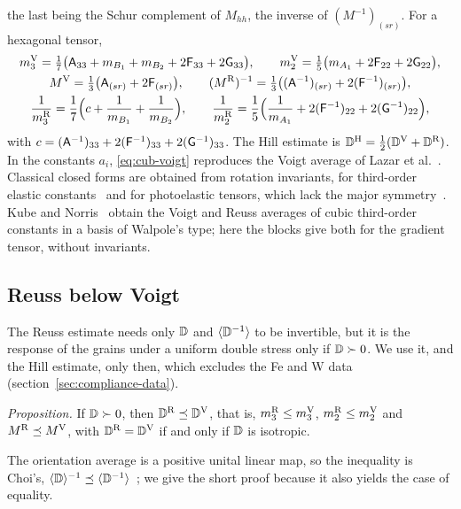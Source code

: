 the last being the Schur complement of $M_{hh}$, the inverse of $(M^{-1})_{(sr)}$. For a
hexagonal tensor,
\begin{equation}
\begin{gathered}
m_3^{\mathrm{V}}=\tfrac17\big(\mathsf{A}_{33}+m_{B_1}+m_{B_2}+2\mathsf{F}_{33}+2\mathsf{G}_{33}\big),\qquad
m_2^{\mathrm{V}}=\tfrac15\big(m_{A_1}+2\mathsf{F}_{22}+2\mathsf{G}_{22}\big),\\
M^{\mathrm{V}}=\tfrac13\big(\mathsf{A}_{(sr)}+2\mathsf{F}_{(sr)}\big),\qquad
(M^{\mathrm{R}})^{-1}=\tfrac13\big((\mathsf{A}^{-1})_{(sr)}+2(\mathsf{F}^{-1})_{(sr)}\big),\\
\frac1{m_3^{\mathrm{R}}}=\frac17\Big(c+\frac1{m_{B_1}}+\frac1{m_{B_2}}\Big),\qquad
\frac1{m_2^{\mathrm{R}}}=\frac15\Big(\frac1{m_{A_1}}+2(\mathsf{F}^{-1})_{22}+2(\mathsf{G}^{-1})_{22}\Big),
\end{gathered}\label{eq:hex-voigt-reuss}
\end{equation}
with $c=(\mathsf{A}^{-1})_{33}+2(\mathsf{F}^{-1})_{33}+2(\mathsf{G}^{-1})_{33}$. The Hill estimate is
$\mathbb{D}^{\mathrm{H}}=\tfrac12(\mathbb{D}^{\mathrm{V}}+\mathbb{D}^{\mathrm{R}})$. In the constants $a_i$, \eqref{eq:cub-voigt}
reproduces the Voigt average of Lazar et al.~\cite[eq.~(158)]{Lazar2022}. Classical closed
forms are obtained from rotation invariants, for third-order elastic
constants~\cite[eqs.~(2.4) and~(2.6)]{Blaschke2017} and for photoelastic tensors, which
lack the major symmetry~\cite{Ranganath1973}. Kube and Norris~\cite{Kube2026} obtain the
Voigt and Reuss averages of cubic third-order constants in a basis of Walpole's type; here
the blocks give both for the gradient tensor, without invariants.

\subsection{Reuss below Voigt}\label{sec:averages-order}

The Reuss estimate needs only $\mathbb{D}$ and $\langle \mathbb{D}^{-1}\rangle$ to be invertible, but it is the
response of the grains under a uniform double stress only if $\mathbb{D}\succ0$. We use it, and
the Hill estimate, only then, which excludes the Fe and W data
(section~\ref{sec:compliance-data}).

\emph{Proposition.} If $\mathbb{D}\succ0$, then $\mathbb{D}^{\mathrm{R}}\preceq\mathbb{D}^{\mathrm{V}}$, that is,
$m_3^{\mathrm{R}}\le m_3^{\mathrm{V}}$, $m_2^{\mathrm{R}}\le m_2^{\mathrm{V}}$ and $M^{\mathrm{R}}\preceq M^{\mathrm{V}}$, with
$\mathbb{D}^{\mathrm{R}}=\mathbb{D}^{\mathrm{V}}$ if and only if $\mathbb{D}$ is isotropic.

The orientation average is a positive unital linear map, so the inequality is Choi's,
$\langle \mathbb{D}\rangle^{-1}\preceq\langle \mathbb{D}^{-1}\rangle$~\cite[theorem~2.3.6]{Bhatia2007}; we give the short
proof because it also yields the case of equality.

